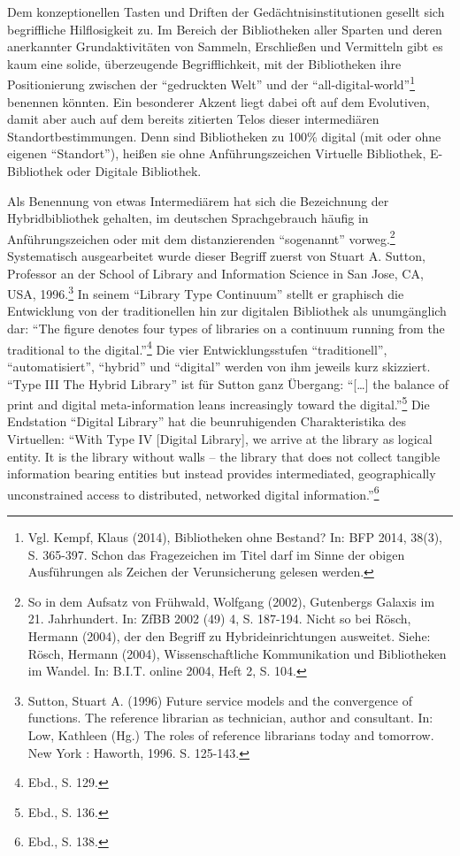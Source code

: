 \documentclass[a4paper,
fontsize=11pt,
oneside,
numbers=noperiodatend,
parskip=half-,
bibliography=totoc,
final
]{scrartcl}
\begin{document}
Dem konzeptionellen Tasten und Driften der Gedächtnisinstitutionen
gesellt sich begriffliche Hilflosigkeit zu. Im Bereich der Bibliotheken
aller Sparten und deren anerkannter Grundaktivitäten von Sammeln,
Erschließen und Vermitteln gibt es kaum eine solide, überzeugende
Begrifflichkeit, mit der Bibliotheken ihre Positionierung zwischen der
\enquote{gedruckten Welt} und der \enquote{all-digital-world}\footnote{Vgl.
  Kempf, Klaus (2014), Bibliotheken ohne Bestand? In: BFP 2014, 38(3),
  S. 365-397. Schon das Fragezeichen im Titel darf im Sinne der obigen
  Ausführungen als Zeichen der Verunsicherung gelesen werden.} benennen
könnten. Ein besonderer Akzent liegt dabei oft auf dem Evolutiven, damit
aber auch auf dem bereits zitierten Telos dieser intermediären
Standortbestimmungen. Denn sind Bibliotheken zu 100\% digital (mit oder
ohne eigenen \enquote{Standort}), heißen sie ohne Anführungszeichen
Virtuelle Bibliothek, E-Bibliothek oder Digitale Bibliothek.

Als Benennung von etwas Intermediärem hat sich die Bezeichnung der
Hybridbibliothek gehalten, im deutschen Sprachgebrauch häufig in
Anführungszeichen oder mit dem distanzierenden \enquote{sogenannt}
vorweg.\footnote{So in dem Aufsatz von Frühwald, Wolfgang (2002),
  Gutenbergs Galaxis im 21. Jahrhundert. In: ZfBB 2002 (49) 4, S.
  187-194. Nicht so bei Rösch, Hermann (2004), der den Begriff zu
  Hybrideinrichtungen ausweitet. Siehe: Rösch, Hermann (2004),
  Wissenschaftliche Kommunikation und Bibliotheken im Wandel. In: B.I.T.
  online 2004, Heft 2, S. 104.} Systematisch ausgearbeitet wurde dieser
Begriff zuerst von Stuart A. Sutton, Professor an der School of Library
and Information Science in San Jose, CA, USA, 1996.\footnote{Sutton,
  Stuart A. (1996) Future service models and the convergence of
  functions. The reference librarian as technician, author and
  consultant. In: Low, Kathleen (Hg.) The roles of reference librarians
  today and tomorrow. New York : Haworth, 1996. S. 125-143.} In seinem
\enquote{Library Type Continuum} stellt er graphisch die Entwicklung von
der traditionellen hin zur digitalen Bibliothek als unumgänglich dar:
\enquote{The figure denotes four types of libraries on a continuum
running from the traditional to the digital.}\footnote{Ebd., S. 129.}
Die vier Entwicklungsstufen \enquote{traditionell},
\enquote{automatisiert}, \enquote{hybrid} und \enquote{digital} werden
von ihm jeweils kurz skizziert. \enquote{Type III The Hybrid Library}
ist für Sutton ganz Übergang: \enquote{{[}\ldots{}{]} the balance of
print and digital meta-information leans increasingly toward the
digital.}\footnote{Ebd., S. 136.} Die Endstation \enquote{Digital
Library} hat die beunruhigenden Charakteristika des Virtuellen:
\enquote{With Type IV {[}Digital Library{]}, we arrive at the library as
logical entity. It is the library without walls -- the library that does
not collect tangible information bearing entities but instead provides
intermediated, geographically unconstrained access to distributed,
networked digital information.}\footnote{Ebd., S. 138.}
\end{document}
